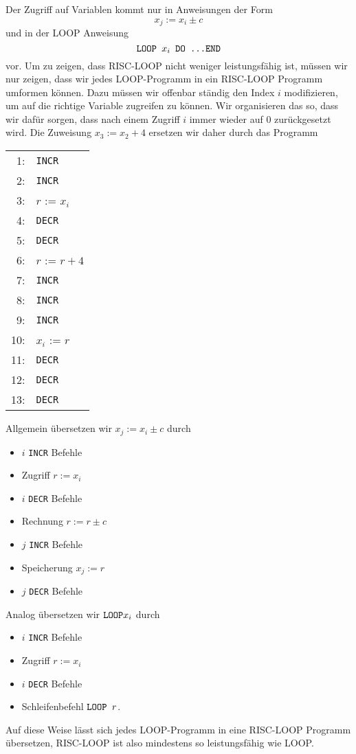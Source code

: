 \begin{loesung}
Der Zugriff auf Variablen kommt nur in Anweisungen der Form
\[
x_j:=x_i\pm c
\]
und in der LOOP Anweisung
\[
\text{\tt LOOP $x_i$ DO \dots END}
\]
vor. Um zu zeigen, dass RISC-LOOP nicht weniger leistungsfähig ist, müssen
wir nur zeigen, dass wir jedes LOOP-Programm in ein RISC-LOOP Programm
umformen können. Dazu müssen wir offenbar ständig den Index $i$ modifizieren,
um auf die richtige Variable zugreifen zu können. Wir organisieren das
so, dass wir dafür sorgen, dass nach einem Zugriff $i$ immer wieder auf
$0$ zurückgesetzt wird. Die Zuweisung $x_3:=x_2+4$ ersetzen wir daher durch das Programm
\begin{center}
\begin{tabular}{r<{:}l}
1&{\tt INCR}\\
2&{\tt INCR}\\
3&$r$ := $x_i$\\
4&{\tt DECR}\\
5&{\tt DECR}\\
6&$r$ := $r + 4$\\
7&{\tt INCR}\\
8&{\tt INCR}\\
9&{\tt INCR}\\
10&$x_i$ := $r$\\
11&{\tt DECR}\\
12&{\tt DECR}\\
13&{\tt DECR}
\end{tabular}
\end{center}
Allgemein übersetzen wir $x_j:=x_i\pm c$ durch
\begin{itemize}
\item $i$ {\tt INCR} Befehle
\item Zugriff $r:=x_i$
\item $i$ {\tt DECR} Befehle
\item Rechnung $r:=r\pm c$
\item $j$ {\tt INCR} Befehle

\item Speicherung $x_j:=r$
\item $j$ {\tt DECR} Befehle
\end{itemize}
Analog übersetzen wir $\text{\tt LOOP} x_i$ durch
\begin{itemize}
\item $i$ {\tt INCR} Befehle
\item Zugriff $r:=x_i$
\item $i$ {\tt DECR} Befehle
\item Schleifenbefehl $\text{\tt LOOP }r$.
\end{itemize}
Auf diese Weise lässt sich jedes LOOP-Programm in eine RISC-LOOP Programm
übersetzen, RISC-LOOP ist also mindestens so leistungsfähig wie LOOP.
\end{loesung}
